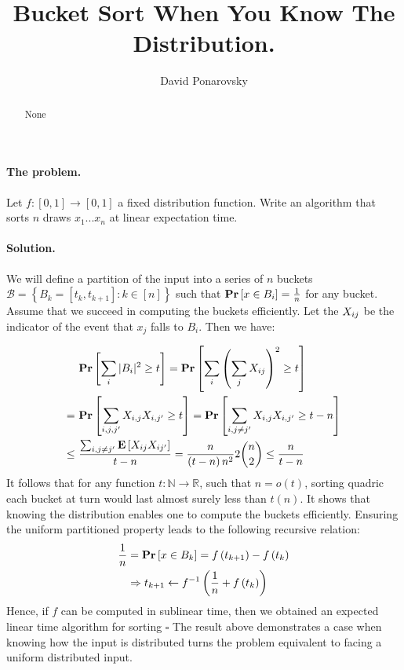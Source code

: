 \documentclass{article}
\begin{document}
\title{Bucket Sort When You Know The Distribution.} 
\author{David Ponarovsky}
\maketitle
\begin{abstract}None 
\end{abstract}
  \paragraph{The problem.} Let $f: [0,1] \rightarrow [0,1]$ a fixed distribution function. Write an algorithm that sorts $n$ draws $x_1 ... x_{n}$ at linear expectation time.  
  \paragraph{Solution.} We will define a partition of the input into a series of $n$ buckets $\mathcal{B} = \left\{ B_{k} = [t_{k}, t_{k+1} ]: k \in [n]  \right\}$ such that $ \mathbf{Pr} \left[ { x \in B_{i}} \right] = \frac{1}{n}$ for any bucket. Assume that we succeed in computing the buckets efficiently. Let the $X_{ij}$ be the indicator of the event that $x_{j}$ falls to $B_i$. Then we have:

  \begin{equation*}
    \begin{split}
      & \ \mathbf{Pr} \left[ {\sum_{i}{|B_{i}|^{2}} \ge t} \right] = \mathbf{Pr} \left[ { \sum_{i}{\left( \sum_{j}X_{ij} \right)^{2}} \ge t   } \right] \\
     = & \ \mathbf{Pr} \left[ { \sum_{i,j,j^{\prime}}{X_{i,j}X_{i,j^{\prime}} } \ge t  } \right] = \mathbf{Pr} \left[ { \sum_{i,j\neq j^{\prime}}{X_{i,j}{X_{i,j^{\prime}} } \ge t - n   } } \right]\\ 
    \le & \ \frac{\sum_{i,j\neq j^{\prime}}{\mathbf{E} \left[ { X_{ij}X_{ij^{\prime}}  } \right]}}{ t - n  } = \frac{n}{\left(t-n \right)n^{2}}2\binom{n}{2}  \le \frac{n}{t-n}  
    \end{split}
  \end{equation*}
  It follows that for any function $t: \mathbb{N} \rightarrow \mathbb{R}$, such that $n = o\left( t \right)$, sorting quadric each bucket at turn would last almost surely less than $t(n)$.  
  It shows that knowing the distribution enables one to compute the buckets efficiently. Ensuring the uniform partitioned property leads to the following recursive relation: 
  \begin{equation*}
    \begin{split}
      \frac{1}{n} &= \mathbf{Pr} \left[ { x \in B_{k} } \right] = f\left( t_{k+1} \right)- f\left( t_{k} \right) \\
      & \Rightarrow t_{k+1} \leftarrow f^{-1}\left( \frac{1}{n} + f\left( t_{k} \right) \right) 
    \end{split}
  \end{equation*} 
  Hence, if $f$ can be computed in sublinear time, then we obtained an expected linear time algorithm for sorting $\square$
  The result above demonstrates a case when knowing how the input is distributed turns the problem equivalent to facing a uniform distributed input.     
\printbibliography 
\end{document}
